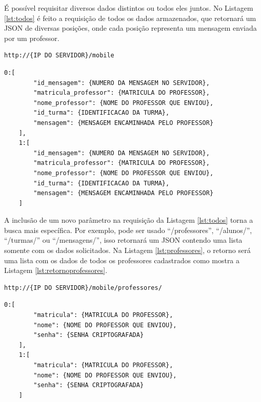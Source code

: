 É possível requisitar diversos dados distintos ou todos eles juntos. 
No Listagem \ref{lst:todos} é feito a requisição de todos os dados armazenados, que retornará um JSON de diversas posições, onde cada posição representa um mensagem enviada por um professor.
\begin{lstlisting}[caption={Requisitar todos os dados},label={lst:todos}]
	http://{IP DO SERVIDOR}/mobile
\end{lstlisting}

\begin{lstlisting}[caption={Retorno da requisição \ref{lst:todos}},label={lst:retornotodos}]
	0:[
		"id_mensagem": {NUMERO DA MENSAGEM NO SERVIDOR},
		"matricula_professor": {MATRICULA DO PROFESSOR},
		"nome_professor": {NOME DO PROFESSOR QUE ENVIOU},
		"id_turma": {IDENTIFICACAO DA TURMA},
		"mensagem": {MENSAGEM ENCAMINHADA PELO PROFESSOR}
	],
	1:[		
		"id_mensagem": {NUMERO DA MENSAGEM NO SERVIDOR},
		"matricula_professor": {MATRICULA DO PROFESSOR},
		"nome_professor": {NOME DO PROFESSOR QUE ENVIOU},
		"id_turma": {IDENTIFICACAO DA TURMA},
		"mensagem": {MENSAGEM ENCAMINHADA PELO PROFESSOR}
	]
\end{lstlisting}

A inclusão de um novo parâmetro na requisição da Listagem \ref{lst:todos} torna a busca mais específica. Por exemplo, pode ser usado ``/professores'', ``/alunos/'', ``/turmas/'' ou ``/mensagens/'', isso retornará um JSON contendo uma lista somente com os dados solicitados. Na Listagem \ref{lst:professores}, o retorno será uma lista com os dados de todos os professores cadastrados como mostra a Listagem \ref{lst:retornoprofessores}.

\begin{lstlisting}[caption={Requisitar lista de dados especifica},label={lst:professores}]
	http://{IP DO SERVIDOR}/mobile/professores/
\end{lstlisting}

\begin{lstlisting}[caption={Retorno da requisição \ref{lst:bd}},label={lst:retornoprofessores}]
	0:[
		"matricula": {MATRICULA DO PROFESSOR},
		"nome": {NOME DO PROFESSOR QUE ENVIOU},
		"senha": {SENHA CRIPTOGRAFADA}
	],
	1:[		
		"matricula": {MATRICULA DO PROFESSOR},
		"nome": {NOME DO PROFESSOR QUE ENVIOU},
		"senha": {SENHA CRIPTOGRAFADA}
	]
\end{lstlisting}

